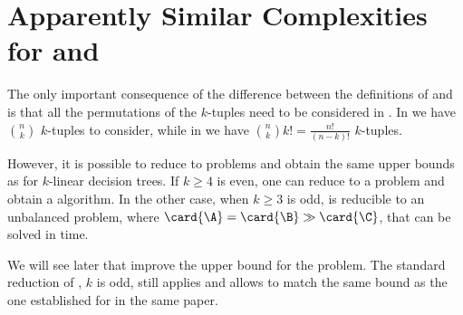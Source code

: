 \section{Apparently Similar Complexities for \kSUM and \kLDT}

The only important consequence of the difference between the definitions of
\kSUM and \kLDT is that all the permutations of the $k$-tuples need to be
considered in \kLDT. In \kSUM we have $\binom{n}{k}$ $k$-tuples to consider,
while in \kLDT we have $\binom{n}{k} k! = \frac{n!}{(n-k)!}$ $k$-tuples.

However, it is possible to reduce \kLDT to \kSUM problems and obtain the same
upper bounds as \kSUM for $k$-linear decision trees. If $k \ge 4$ is even, one
can reduce \kLDT to a \twoSUM problem and obtain a 
algorithm. In the other case, when $k \ge 3$ is odd, \kLDT is reducible to an
unbalanced \threeSUM problem, where $\card{\A} = \card{\B} \gg \card{\C}$,
that can be solved in  time.

We will see later that \citet*{gronlund:2014} improve the upper bound for the
\threeSUM problem. The standard reduction of \kLDT, $k$ is odd, still applies
and allows to match the same 
bound as the one established for \threeSUM in the same paper.

